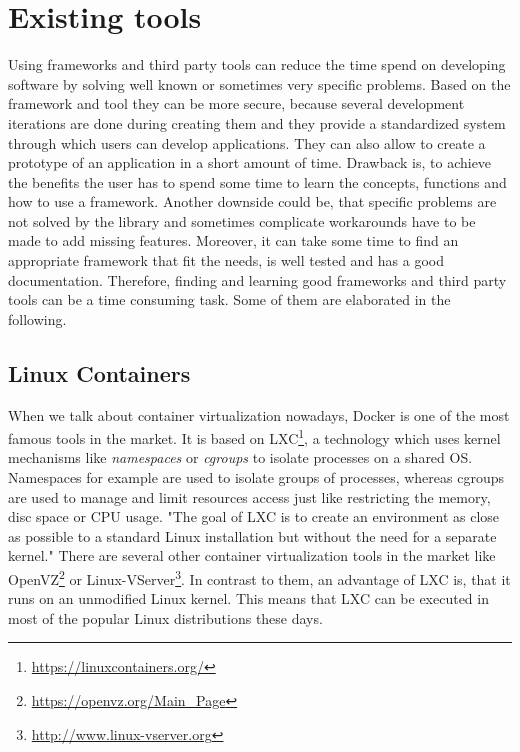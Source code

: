\section{Existing tools}

Using frameworks and third party tools can reduce the time spend on developing software by solving well known or sometimes very specific problems.
Based on the framework and tool they can be more secure, because several development iterations are done during creating them and they provide a standardized system through which users can develop applications.
They can also allow to create a prototype of an application in a short amount of time.
Drawback is, to achieve the benefits the user has to spend some time to learn the concepts, functions and how to use a framework.
Another downside could be, that specific problems are not solved by the library and sometimes complicate workarounds have to be made to add missing features.
Moreover, it can take some time to find an appropriate framework that fit the needs, is well tested and has a good documentation.
Therefore, finding and learning good frameworks and third party tools can be a time consuming task.
Some of them are elaborated in the following.

\subsection{Linux Containers}
When we talk about container virtualization nowadays, Docker is one of the most famous tools in the market.
It is based on \ac{LXC}\footnote{\url{https://linuxcontainers.org/}}, a technology which uses kernel mechanisms like \textit{namespaces} or \textit{cgroups} to isolate processes on a shared \ac{OS}.\autocite[cf.][p. 381]{Pahl:2015}
Namespaces for example are used to isolate groups of processes, whereas cgroups are used to manage and limit resources access just like restricting the memory, disc space or \ac{CPU} usage.\autocite[cf.][p. 381]{Pahl:2015}
"The goal of \ac{LXC} is to create an environment as close as possible to a standard Linux installation but without the need for a separate kernel."\autocite[p. 72]{Tosatto:2015}
There are several other container virtualization tools in the market like OpenVZ\footnote{\url{https://openvz.org/Main_Page}} or Linux-VServer\footnote{\url{http://www.linux-vserver.org}}.
In contrast to them, an advantage of \ac{LXC} is, that it runs on an unmodified Linux kernel.
This means that \ac{LXC} can be executed in most of the popular Linux distributions these days.

